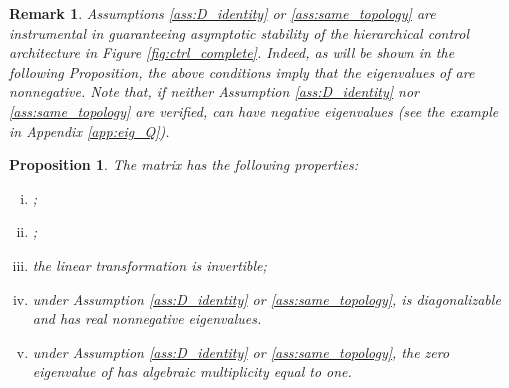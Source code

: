 \documentclass[a4paper]{article}
\theoremstyle{plain}
\newtheorem{rmk}{Remark}
\newtheorem{prp}{Proposition}
\begin{document}
	\begin{rmk}
		Assumptions \ref{ass:D_identity} or \ref{ass:same_topology} are instrumental in guaranteeing asymptotic stability of the hierarchical control architecture in Figure \ref{fig:ctrl_complete}. Indeed, as will be shown in the following Proposition, the above conditions imply that the eigenvalues of  are nonnegative.
		Note that, if neither Assumption \ref{ass:D_identity} nor \ref{ass:same_topology} are verified,  can have negative eigenvalues (see the example in Appendix \ref{app:eig_Q}).
	\end{rmk}

\begin{prp}
	\label{prop_2}
	The matrix  has the following properties:
	\begin{enumerate}[(i)]
		\item \label{prop:zero_row_sum} ;
		\item \label{prop:range} ;
		\item \label{prop:Q_invertible} the linear transformation  is invertible;
		\item \label{prop:diag_and_psd} under Assumption \ref{ass:D_identity} or \ref{ass:same_topology},  is diagonalizable and has real nonnegative eigenvalues.
		\item \label{prop:zero_eig} under Assumption \ref{ass:D_identity} or \ref{ass:same_topology}, the zero eigenvalue of  has algebraic multiplicity equal to one.
	\end{enumerate}
\end{prp}
\end{document}
